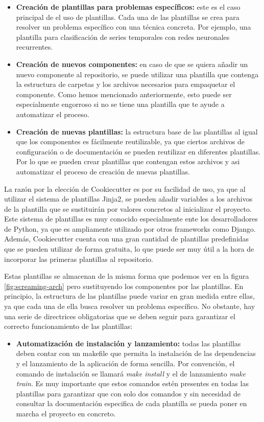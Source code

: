 \begin{itemize}
    \item \textbf{Creación de plantillas para problemas específicos:} este es el caso
    principal de el uso de plantillas. Cada una de las plantillas se crea para resolver
    un problema específico con una técnica concreta. Por ejemplo, una plantilla para
    clasificación de series temporales con redes neuronales recurrentes.
    \item \textbf{Creación de nuevos componentes:} en caso de que se quiera añadir
    un nuevo componente al repositorio, se puede utilizar una plantilla que contenga
    la estructura de carpetas y los archivos necesarios para empaquetar el componente.
    Como hemos mencionado anteriormente, esto puede ser especialmente engorroso si no
    se tiene una plantilla que te ayude a automatizar el proceso.
    \item \textbf{Creación de nuevas plantillas:} la estructura base de las plantillas
    al igual que los componentes es fácilmente reutilizable, ya que ciertos archivos de
    configuración o de documentación se pueden reutilizar en diferentes plantillas. Por
    lo que se pueden crear plantillas que contengan estos archivos y asi automatizar el
    proceso de creación de nuevas plantillas. 
\end{itemize}

La razón por la elección de Cookiecutter es por su facilidad de uso, ya que
al utilizar el sistema de plantillas Jinja2, se pueden añadir variables a los
archivos de la plantilla que se sustituirán por valores concretos al inicializar
el proyecto. Este sistema de plantillas es muy conocido especialmente ente los
desarrolladores de Python, ya que es ampliamente utilizado por otros frameworks
como Django. Además, Cookiecutter cuenta con una gran cantidad de plantillas
predefinidas que se pueden utilizar de forma gratuita, lo que puede ser muy útil
a la hora de incorporar las primeras plantillas al repositorio.\medskip

Estas plantillas se almacenan de la misma forma que podemos ver en la figura
\ref{fig:screaming-arch} pero sustituyendo los componentes por las plantillas.
En principio, la estructura de las plantillas puede variar en gran medida entre
ellas, ya que cada una de ella busca resolver un problema específico. No obstante,
hay una serie de directrices obligatorias que se deben seguir para garantizar el
correcto funcionamiento de las plantillas:

\begin{itemize}
    \item \textbf{Automatización de instalación y lanzamiento:} todas las plantillas
    deben contar con un makefile que permita la instalación de las dependencias y
    el lanzamiento de la aplicación de forma sencilla. Por convención, el comando
    de instalación se llamará \textit{make install} y el de lanzamiento \textit{make train}.
    Es muy importante que estos comandos estén presentes en todas las plantillas para
    garantizar que con solo dos comandos y sin necesidad de consultar la documentación
    especifica de cada plantilla se pueda poner en marcha el proyecto en concreto.
\end{itemize}

